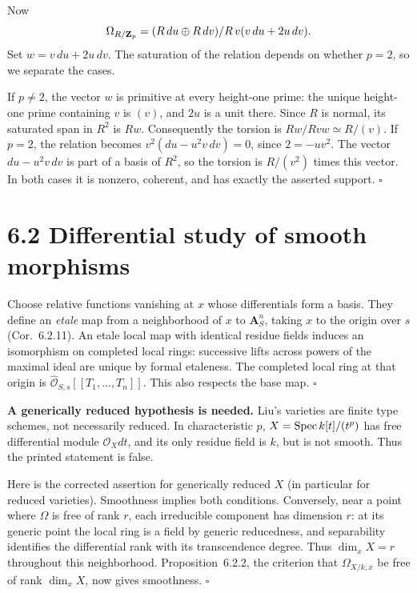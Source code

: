 \documentclass[11pt]{article}
\let\chapterexercise\exercise
\renewcommand{\exercise}[2]{\Needspace{8\baselineskip}\chapterexercise{#1}{#2}}
\begin{document}
Now
\[ \Omega_{R/\mathbf Z_p}=(R\,du\oplus R\,dv)/R\,v(v\,du+2u\,dv). \]
Set $w=v\,du+2u\,dv$. The saturation of the relation depends on whether $p=2$, so we separate the cases.

If $p\ne2$, the vector $w$ is primitive at every height-one prime: the unique height-one prime containing $v$ is $(v)$, and $2u$ is a unit there. Since $R$ is normal, its saturated span in $R^2$ is $Rw$. Consequently the torsion is $Rw/Rvw\simeq R/(v)$.
If $p=2$, the relation becomes $v^2(du-u^2v\,dv)=0$, since $2=-uv^2$. The vector $du-u^2v\,dv$ is part of a basis of $R^2$, so the torsion is $R/(v^2)$ times this vector. In both cases it is nonzero, coherent, and has exactly the asserted support. \hfill$\square$

\section*{6.2 Differential study of smooth morphisms}

\pf
Choose relative functions vanishing at $x$ whose differentials form a basis. They define an \emph{etale} map from a neighborhood of $x$ to $\mathbf A^n_S$, taking $x$ to the origin over $s$ (Cor.~6.2.11). An etale local map with identical residue fields induces an isomorphism on completed local rings: successive lifts across powers of the maximal ideal are unique by formal etaleness. The completed local ring at that origin is $\widehat{\mathcal O}_{S,s}[[T_1,\ldots,T_n]]$. This also respects the base map. \hfill$\square$

\pf
\textbf{A generically reduced hypothesis is needed.} Liu's varieties are finite type schemes, not necessarily reduced. In characteristic $p$, $X=\operatorname{Spec} k[t]/(t^p)$ has free differential module $\mathcal O_Xdt$, and its only residue field is $k$, but is not smooth. Thus the printed statement is false.

Here is the corrected assertion for generically reduced $X$ (in particular for reduced varieties). Smoothness implies both conditions. Conversely, near a point where $\Omega$ is free of rank $r$, each irreducible component has dimension $r$: at its generic point the local ring is a field by generic reducedness, and separability identifies the differential rank with its transcendence degree. Thus $\dim_xX=r$ throughout this neighborhood. Proposition~6.2.2, the criterion that $\Omega_{X/k,x}$ be free of rank $\dim_xX$, now gives smoothness. \hfill$\square$
\end{document}
